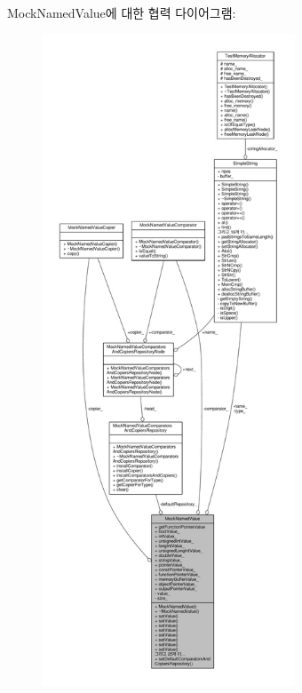 Mock\+Named\+Value에 대한 협력 다이어그램\+:
\nopagebreak
\begin{figure}[H]
\begin{center}
\leavevmode
\includegraphics[height=550pt]{class_mock_named_value__coll__graph}
\end{center}
\end{figure}
